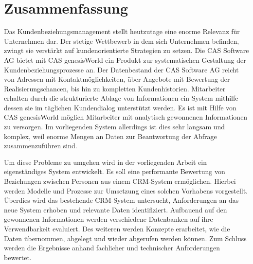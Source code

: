 
\chapter*{\centering Zusammenfassung}



Das Kundenbeziehungsmanagement stellt heutzutage eine enorme Relevanz für Unternehmen dar. Der stetige Wettbewerb in dem sich Unternehmen
befinden, zwingt sie verstärkt auf kundenorientierte Strategien zu setzen. Die CAS Software AG bietet mit CAS genesisWorld ein Produkt zur systematischen Gestaltung der Kundenbeziehungsprozesse an. Der Datenbestand der CAS Software AG reicht von Adressen mit Kontaktmöglichkeiten, über Angebote mit Bewertung der Realisierungschancen, bis hin zu kompletten Kundenhistorien. Mitarbeiter erhalten durch die strukturierte Ablage von Informationen ein System mithilfe dessen sie im täglichen Kundendialog unterstützt werden. Es ist mit Hilfe von CAS genesisWorld möglich Mitarbeiter mit analytisch gewonnenen Informationen zu versorgen. Im vorliegenden System allerdings ist dies sehr langsam und komplex, weil enorme Mengen an Daten zur Beantwortung der Abfrage zusammenzuführen sind.       

Um diese Probleme zu umgehen wird in der vorliegenden Arbeit ein eigenständiges System entwickelt. Es soll eine performante Bewertung von Beziehungen zwischen Personen aus einem CRM-System ermöglichen. Hierbei werden Modelle und Prozesse zur Umsetzung eines solchen Vorhabens vorgestellt. Überdies wird das bestehende CRM-System untersucht, Anforderungen an das neue System erhoben und relevante Daten identifiziert. Aufbauend auf den gewonnenen Informationen werden verschiedene Datenbanken auf ihre Verwendbarkeit evaluiert. Des weiteren werden Konzepte erarbeitet, wie die Daten übernommen, abgelegt und wieder abgerufen werden können. Zum Schluss werden die Ergebnisse anhand fachlicher und technischer Anforderungen bewertet.